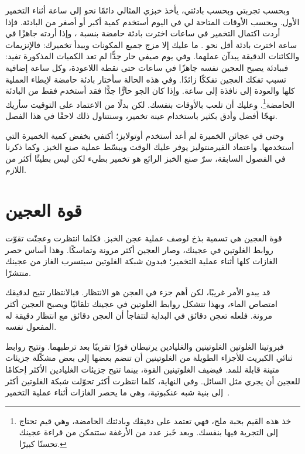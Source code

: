 وبحسب تجربتي وبحسب بادئتي، يأخذ خبزي المثالي دائمًا نحو  إلى  ساعة أثناء التخمير الأول. وبحسب الأوقات المتاحة لي في اليوم أستخدم كمية أكبر أو أصغر من البادئة. فإذا أردت اكتمال التخمير في  ساعات اخترت بادئة حامضة بنسبة ، وإذا أردته جاهزًا في  ساعة اخترت بادئة أقل نحو . ما عليك إلا مزج جميع المكونات ويبدأ تخميرك: فالإنزيمات والكائنات الدقيقة يبدآن عملهما. وفي يوم صيفي حار جدًّا لم تعد الكميات المذكورة تفيد: فببادئة  يصبح العجين نفسه جاهزًا في  ساعات حتى نقطة اللاعودة، وكل ساعة إضافية تسبب تفكك العجين تفككًا زائدًا. وفي هذه الحالة سأختار بادئة حامضة  لإبطاء العملية كلها والعودة إلى نافذة  إلى  ساعة. وإذا كان الجو حارًّا جدًّا فقد أستخدم  فقط من البادئة الحامضة\footnote{خذ هذه القيم بحبة ملح، فهي تعتمد على دقيقك وبادئتك الحامضة، وهي قيم تحتاج إلى التجربة فيها بنفسك. وبعد خَبز عدد من الأرغفة ستتمكن من قراءة عجينك تحسنًا كبيرًا.}. وعليك أن تلعب بالأوقات بنفسك. لكن بدلًا من الاعتماد على التوقيت سأريك نهجًا أفضل وأدق بكثير باستخدام عينة تخمير، وسنتناول ذلك لاحقًا في هذا الفصل.

وحتى في عجائن الخميرة لم أعد أستخدم أوتولايز؛ أكتفي بخفض كمية الخميرة التي أستخدمها. واعتماد الفيرمنتوليز يوفر عليك الوقت ويبسّط عملية صنع الخبز. وكما ذكرنا في الفصول السابقة، سرّ صنع الخبز الرائع هو تخمير بطيء لكن ليس بطيئًا أكثر من اللازم.

\section{قوة العجين}

قوة العجين هي تسمية بذخ لوصف عملية عجن الخبز. فكلما انتظرت وعجنّت تقوّت روابط الغلوتين في عجينك، وصار العجين أكثر مرونة وتماسكًا. وهذا أساس حصر الغازات كلها أثناء عملية التخمير؛ فبدون شبكة الغلوتين سيتسرب الغاز من عجينك منتشرًا.

\begin{flowchart}[!htb]

\caption[عملية تطوير الغلوتين في عجين قمحي]{عملية تطوير الغلوتين في عجين قمحي.}
\label{fig:wheat-sourdough-kneading-process}
\end{flowchart}

قد يبدو الأمر غريبًا، لكن أهم جزء في العجن هو الانتظار. فبالانتظار تتيح لدقيقك امتصاص الماء، وبهذا تتشكل روابط الغلوتين في عجينك تلقائيًا ويصبح العجين أكثر مرونة. فلعله تعجن  دقائق في البداية لتتفاجأ أن العجن  دقائق مع انتظار  دقيقة له المفعول نفسه.

فبروتينا الغلوتين الغلوتينين والغليادين يرتبطان فورًا تقريبًا بعد ترطبهما. وتتيح روابط ثنائي الكبريت للأجزاء الطويلة من الغلوتينين أن تنضم بعضها إلى بعض مشكّلة جزيئات متينة قابلة للمد. فيضيف الغلوتينين القوة، بينما تتيح جزيئات الغليادين الأكثر إحكامًا للعجين أن يجري مثل السائل. وفي النهاية، كلما انتظرت أكثر تحوّلت شبكة الغلوتين أكثر إلى بنية شبه عنكبوتية، وهي ما يحصر الغازات أثناء عملية التخمير~\cite{how+does+gluten+work}.

